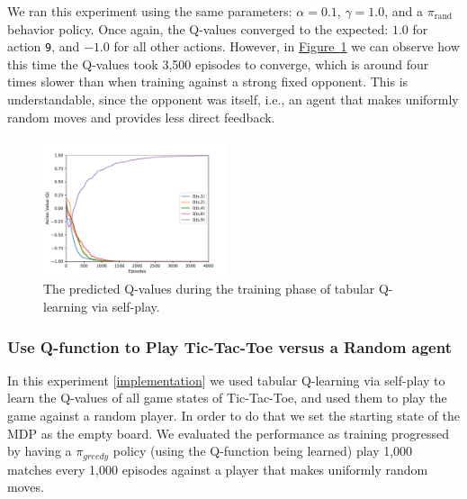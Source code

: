 \documentclass{article}
\newcommand{\GithubURL}[1]{[\href{https://github.com/davidrobles/mlnd-capstone-code/blob/master/#1}{implementation}]}
\begin{document}
We ran this experiment using the same parameters: $\alpha = 0.1$, $\gamma=1.0$, and a
$\pi_{\textrm{rand}}$ behavior policy. Once again, the Q-values converged to the expected: $1.0$ for
action \texttt{9}, and $-1.0$ for all other actions. However, in
\hyperref[fig:tic-ql-tab-simple-selfplay-progress]
{Figure~\ref*{fig:tic-ql-tab-simple-selfplay-progress}} we can observe how this time the Q-values
took 3,500 episodes to converge, which is around four times slower than when training against a
strong fixed opponent. This is understandable, since the opponent was itself, i.e., an agent that
makes uniformly random moves and provides less direct feedback.


\begin{figure}[!b]
    \centering
    \includegraphics[width=0.48\textwidth]{figures/tic_ql_tab_simple_selfplay_progress.pdf}
    \caption{The predicted Q-values during the training phase of tabular Q-learning via self-play.}
    \label{fig:tic-ql-tab-simple-selfplay-progress}
\end{figure}


\subsubsection{Use Q-function to Play Tic-Tac-Toe versus a Random agent}

In this experiment \GithubURL{experiments/tic_ql_tab_full_selfplay.py} we used tabular Q-learning via
self-play to learn the Q-values of all game states of Tic-Tac-Toe, and used them to play the game
against a random player. In order to do that we set the starting state of the MDP as the empty
board. We evaluated the performance as training progressed by having a $\pi_{greedy}$ policy (using
the Q-function being learned) play 1,000 matches every 1,000 episodes against a player that makes
uniformly random moves.
\end{document}
